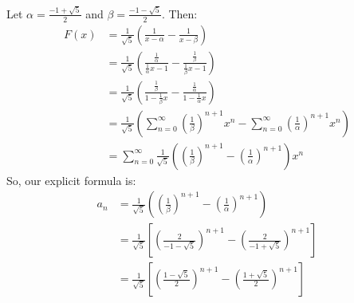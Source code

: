 \documentclass[letterpaper]{article}
\begin{document}
\begin{enumerate}[(1)]
    Let $\alpha = \frac{-1 + \sqrt{5}}{2}$ and $\beta = \frac{-1 - \sqrt{5}}{2}$. Then:
    \begin{equation*}
        \begin{aligned}
            F(x) &= \frac{1}{\sqrt{5}} \left(\frac{1}{x - \alpha} - \frac{1}{x - \beta}\right) \\ 
                &= \frac{1}{\sqrt{5}} \left(\frac{\frac{1}{\alpha}}{\frac{1}{\alpha}x - 1} - \frac{\frac{1}{\beta}}{\frac{1}{\beta}x - 1}\right) \\ 
                &= \frac{1}{\sqrt{5}} \left(\frac{\frac{1}{\beta}}{1 - \frac{1}{\beta}x} - \frac{\frac{1}{\alpha}}{1 - \frac{1}{\alpha}x}\right) \\ 
                &= \frac{1}{\sqrt{5}} \left(\sum_{n = 0}^{\infty} \left(\frac{1}{\beta}\right)^{n + 1} x^n - \sum_{n = 0}^{\infty} \left(\frac{1}{\alpha}\right)^{n + 1} x^n\right) \\ 
                &= \sum_{n = 0}^{\infty} \frac{1}{\sqrt{5}} \left(\left(\frac{1}{\beta}\right)^{n + 1} - \left(\frac{1}{\alpha}\right)^{n + 1}\right) x^n
        \end{aligned}
    \end{equation*}
    So, our explicit formula is:
    \begin{equation*}
        \begin{aligned}
            a_n &= \frac{1}{\sqrt{5}} \left(\left(\frac{1}{\beta}\right)^{n + 1} - \left(\frac{1}{\alpha}\right)^{n + 1}\right) \\ 
                &= \frac{1}{\sqrt{5}} \left[\left(\frac{2}{-1 - \sqrt{5}}\right)^{n + 1} - \left(\frac{2}{-1 + \sqrt{5}}\right)^{n + 1}\right] \\ 
                &= \frac{1}{\sqrt{5}} \left[\left(\frac{1 - \sqrt{5}}{2}\right)^{n + 1} - \left(\frac{1 + \sqrt{5}}{2}\right)^{n + 1}\right]
        \end{aligned}
    \end{equation*}
\end{enumerate}
\end{document}
